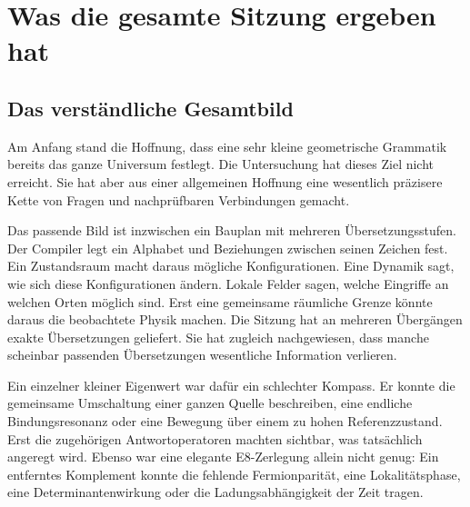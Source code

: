 \chapter{Was die gesamte Sitzung ergeben hat}
\section{Das verständliche Gesamtbild}
Am Anfang stand die Hoffnung, dass eine sehr kleine geometrische Grammatik bereits das ganze Universum festlegt. Die Untersuchung hat dieses Ziel nicht erreicht. Sie hat aber aus einer allgemeinen Hoffnung eine wesentlich präzisere Kette von Fragen und nachprüfbaren Verbindungen gemacht.

Das passende Bild ist inzwischen ein Bauplan mit mehreren Übersetzungsstufen. Der Compiler legt ein Alphabet und Beziehungen zwischen seinen Zeichen fest. Ein Zustandsraum macht daraus mögliche Konfigurationen. Eine Dynamik sagt, wie sich diese Konfigurationen ändern. Lokale Felder sagen, welche Eingriffe an welchen Orten möglich sind. Erst eine gemeinsame räumliche Grenze könnte daraus die beobachtete Physik machen. Die Sitzung hat an mehreren Übergängen exakte Übersetzungen geliefert. Sie hat zugleich nachgewiesen, dass manche scheinbar passenden Übersetzungen wesentliche Information verlieren.


Ein einzelner kleiner Eigenwert war dafür ein schlechter Kompass. Er konnte die gemeinsame Umschaltung einer ganzen Quelle beschreiben, eine endliche Bindungsresonanz oder eine Bewegung über einem zu hohen Referenzzustand. Erst die zugehörigen Antwortoperatoren machten sichtbar, was tatsächlich angeregt wird. Ebenso war eine elegante E8-Zerlegung allein nicht genug: Ein entferntes Komplement konnte die fehlende Fermionparität, eine Lokalitätsphase, eine Determinantenwirkung oder die Ladungsabhängigkeit der Zeit tragen.

